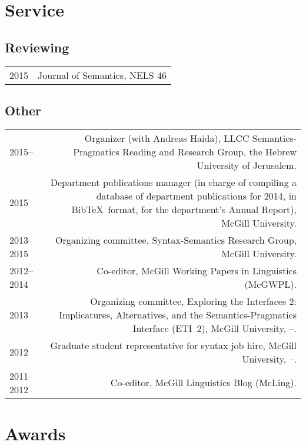\documentclass[11pt,letterpaper,twoside]{article}
\makeatletter
\newcommand{\formatdatenoday}[2]{\mydatenoday\formatdate{0}{#1}{#2}}
\newenvironment{cvsection}{%
  \renewcommand{\arraystretch}{1.75}
  \begin{longtable}[l]{@{} L R @{}}
}{%
  \end{longtable}
}
\makeatother
\begin{document}
\section*{Service}

\subsection*{Reviewing}

\begin{cvsection}
  2015 & Journal of Semantics, NELS 46
\end{cvsection}

\subsection*{Other}

\begin{cvsection}
  2015-- & Organizer (with Andreas Haida), LLCC Semantics-Pragmatics Reading
  and Research Group, the Hebrew University of Jerusalem.\\

  2015 & Department publications manager (in charge of compiling a database of
  department publications for 2014, in Bib\TeX\ format, for the department's
  Annual Report), McGill University.\\

  2013--2015 & Organizing committee, Syntax-Semantics Research Group, McGill
  University.\\

  2012--2014 & Co-editor, McGill Working Papers in Linguistics (McGWPL).\\

  2013 & Organizing committee, Exploring the Interfaces 2: Implicatures,
  Alternatives, and the Semantics-Pragmatics Interface (ETI~2), McGill
  University, \shortmonthname[4]--\formatdatenoday{6}{2013}.\\

  2012 & Graduate student representative for syntax job hire, McGill
  University, \shortmonthname[5]--\formatdatenoday{6}{2012}.\\

  2011--2012 & Co-editor, McGill Linguistics Blog (McLing).\\
\end{cvsection}

\section*{Awards}
\end{document}
